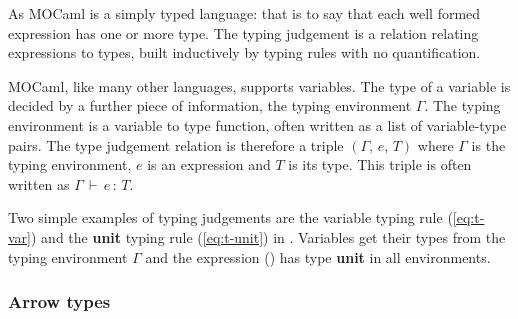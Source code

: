 \documentclass[12pt,twoside,notitlepage]{report}
\theoremstyle{plain}%
\theoremstyle{definition}
\theoremstyle{remark}
\begin{document}
As MOCaml is a simply typed language: that is to say that each well formed expression has one or more type. The typing judgement is a relation relating expressions to types, built inductively by typing rules with no quantification. 

MOCaml, like many other languages, supports variables. The type of a variable is decided by a further piece of information, the typing environment $ \Gamma $. The typing environment is a variable to type function, often written as a list of variable-type pairs. The type judgement relation is therefore a triple $ (\Gamma,\,e,\,T) $ where $ \Gamma $ is the typing environment, $ e $ is an expression and $ T $ is its type. This triple is often written as $ \Gamma\,\vdash\,e\,:\,T $. 

Two simple examples of typing judgements are the variable typing rule (\ref{eq:t-var}) and the \textbf{unit} typing rule (\ref{eq:t-unit}) in . Variables get their types from the typing environment $ \Gamma $ and the expression () has type \textbf{unit} in all environments.
\subsubsection{Arrow types}
\end{document}
